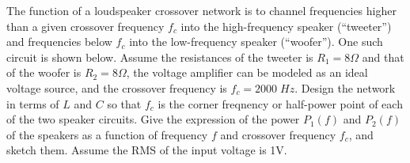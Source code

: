 


\item The function of a loudspeaker crossover network is to channel 
  frequencies higher than a given crossover frequency $f_c$ into the
  high-frequency speaker (``tweeter'') and frequencies below $f_c$ into
  the low-frequency speaker (``woofer''). One such circuit is shown below.
  Assume the resistances of the tweeter is $R_1=8\Omega$ and that of the 
  woofer is $R_2=8\Omega$, the voltage amplifier can be modeled as an
  ideal voltage source, and the crossover frequency is $f_c=2000\; Hz$.
  Design the network in terms of $L$ and $C$ so that $f_c$ is the corner
  freqnency or half-power point of each of the two speaker circuits. Give 
  the expression of the power $P_1(f)$ and $P_2(f)$ of the speakers as a 
  function of frequency $f$ and crossover frequency $f_c$, and sketch them.
  Assume the RMS of the input voltage is 1V.


%   

